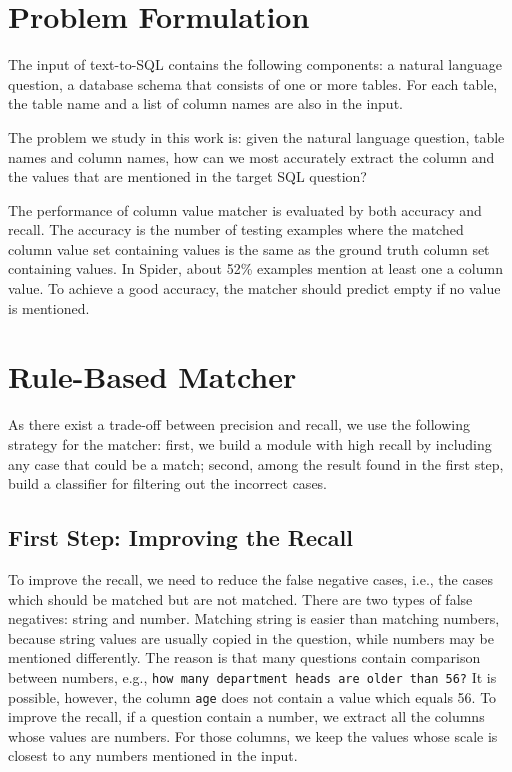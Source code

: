 
\section{Problem Formulation}

The input of text-to-SQL contains the following components: a natural language question, a database schema that consists of one or more tables. For each table, the table name and a list of column names are also in the input. 

The problem we study in this work is: given the natural language question, table names and column names, how can we most accurately extract the column and the values that are mentioned in the target SQL question? 

The performance of column value matcher is evaluated by both accuracy and recall. The accuracy is the number of testing examples where the matched column value set containing values is the same as the ground truth column set containing values. In Spider, about 52\% examples mention at least one a column value. To achieve a good accuracy, the matcher should predict empty if no value is mentioned. 

\section{Rule-Based Matcher}
\label{sec:rule}

As there exist a trade-off between precision and recall, we use the following strategy for the matcher: first, we build a module with high recall by including any case that could be a match; second, among the result found in the first step, build a classifier for filtering out the incorrect cases. 

\subsection{First Step: Improving the Recall}

To improve the recall, we need to reduce the false negative cases, i.e., the cases which should be matched but are not matched. There are two types of false negatives: string and number. Matching string is easier than matching numbers, because string values are usually copied in the question, while numbers may be mentioned differently. The reason is that many questions contain comparison between numbers, e.g., \texttt{how many department heads are older than 56?} It is possible, however, the column \texttt{age} does not contain a value which equals 56. To improve the recall, if a question contain a number, we extract all the columns whose values are numbers. For those columns, we keep the values whose scale is closest to any numbers mentioned in the input. 

